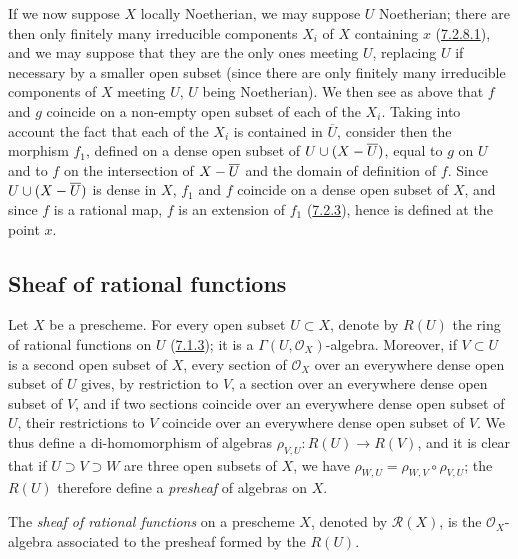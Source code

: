 If we now suppose $X$ locally Noetherian, we may suppose $U$ Noetherian;
there are then only finitely many irreducible components $X_i$ of $X$
containing $x$ (\hyperref[I.7.2.8.1]{7.2.8.1}), and we may suppose that
they are the only ones meeting $U$, replacing $U$ if necessary by a smaller
open subset (since there are only finitely many irreducible components of $X$
meeting $U$, $U$ being Noetherian). We then see as above that $f$ and $g$
coincide on a non-empty open subset of each of the $X_i$. Taking into account
the fact that each of the $X_i$ is contained in $\overline U$, consider then
the morphism $f_1$, defined on a dense open subset of $U\cup(X-\overline U)$,
equal to $g$ on $U$ and to $f$ on the intersection of $X-\overline U$ and the
domain of definition of $f$. Since $U\cup(X-\overline U)$ is dense in $X$,
$f_1$ and $f$ coincide on a dense open subset of $X$, and since $f$ is a
rational map, $f$ is an extension of $f_1$ (\hyperref[I.7.2.3]{7.2.3}),
hence is defined at the point $x$.

\subsection{Sheaf of rational functions}
\label{subsection:I.7.3}

\begin{env}[7.3.1]
\label{I.7.3.1}
Let $X$ be a prescheme. For every open subset $U\subset X$, denote by $R(U)$
the ring of rational functions on $U$
(\hyperref[I.7.1.3]{7.1.3}); it is a
$\Gamma(U,\mathscr{O}_X)$-algebra. Moreover, if $V\subset U$ is a second
open subset of $X$, every section of $\mathscr{O}_X$ over an everywhere dense
open subset of $U$ gives, by restriction to $V$, a section over an everywhere
dense open subset of $V$, and if two sections coincide over an everywhere
dense open subset of $U$, their restrictions to $V$ coincide over an
everywhere dense open subset of $V$. We thus define a di-homomorphism of
algebras $\rho_{V,U}:R(U)\to R(V)$, and it is clear that if
$U\supset V\supset W$ are three open subsets of $X$, we have
$\rho_{W,U}=\rho_{W,V}\circ\rho_{V,U}$; the $R(U)$ therefore define a
\emph{presheaf} of algebras on $X$.
\end{env}

\begin{definition}[7.3.2]
\label{I.7.3.2}
The \emph{sheaf of rational functions} on a prescheme $X$, denoted by
$\mathscr{R}(X)$, is the $\mathscr{O}_X$-algebra associated to the presheaf
formed by the $R(U)$.
\end{definition}

